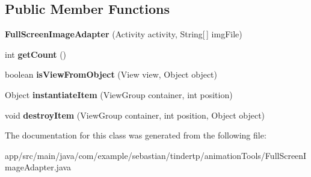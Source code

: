 \subsection*{Public Member Functions}
\begin{DoxyCompactItemize}
\item 
{\bfseries Full\+Screen\+Image\+Adapter} (Activity activity, String\mbox{[}$\,$\mbox{]} img\+File)\hypertarget{classcom_1_1example_1_1sebastian_1_1tindertp_1_1animationTools_1_1FullScreenImageAdapter_a9407a5197bcab10cbe809237a640f905}{}\label{classcom_1_1example_1_1sebastian_1_1tindertp_1_1animationTools_1_1FullScreenImageAdapter_a9407a5197bcab10cbe809237a640f905}

\item 
int {\bfseries get\+Count} ()\hypertarget{classcom_1_1example_1_1sebastian_1_1tindertp_1_1animationTools_1_1FullScreenImageAdapter_a04a1dc1c283ad2d3d6c77f7dc351d061}{}\label{classcom_1_1example_1_1sebastian_1_1tindertp_1_1animationTools_1_1FullScreenImageAdapter_a04a1dc1c283ad2d3d6c77f7dc351d061}

\item 
boolean {\bfseries is\+View\+From\+Object} (View view, Object object)\hypertarget{classcom_1_1example_1_1sebastian_1_1tindertp_1_1animationTools_1_1FullScreenImageAdapter_a187d0f9df7d3ed5009c280306f32e22f}{}\label{classcom_1_1example_1_1sebastian_1_1tindertp_1_1animationTools_1_1FullScreenImageAdapter_a187d0f9df7d3ed5009c280306f32e22f}

\item 
Object {\bfseries instantiate\+Item} (View\+Group container, int position)\hypertarget{classcom_1_1example_1_1sebastian_1_1tindertp_1_1animationTools_1_1FullScreenImageAdapter_a928053683a38bbf7a604d480b4c8e553}{}\label{classcom_1_1example_1_1sebastian_1_1tindertp_1_1animationTools_1_1FullScreenImageAdapter_a928053683a38bbf7a604d480b4c8e553}

\item 
void {\bfseries destroy\+Item} (View\+Group container, int position, Object object)\hypertarget{classcom_1_1example_1_1sebastian_1_1tindertp_1_1animationTools_1_1FullScreenImageAdapter_ad1736ed3796ba432abe2260e0db76054}{}\label{classcom_1_1example_1_1sebastian_1_1tindertp_1_1animationTools_1_1FullScreenImageAdapter_ad1736ed3796ba432abe2260e0db76054}

\end{DoxyCompactItemize}


The documentation for this class was generated from the following file\+:\begin{DoxyCompactItemize}
\item 
app/src/main/java/com/example/sebastian/tindertp/animation\+Tools/Full\+Screen\+Image\+Adapter.\+java\end{DoxyCompactItemize}
